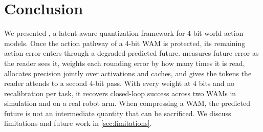 \section{Conclusion}
\label{sec:conclusion}

We presented \method, a latent-aware quantization framework for 4-bit world action models.
Once the action pathway of a 4-bit WAM is protected, its remaining action error enters through a degraded predicted future.
\method measures future error as the reader sees it, weights each rounding error by how many times it is read, allocates precision jointly over activations and caches, and gives the tokens the reader attends to a second 4-bit pass.
With every weight at 4 bits and no recalibration per task, it recovers closed-loop success across two WAMs in simulation and on a real robot arm.
When compressing a WAM, the predicted future is not an intermediate quantity that can be sacrificed.
We discuss limitations and future work in \cref{sec:limitations}.
